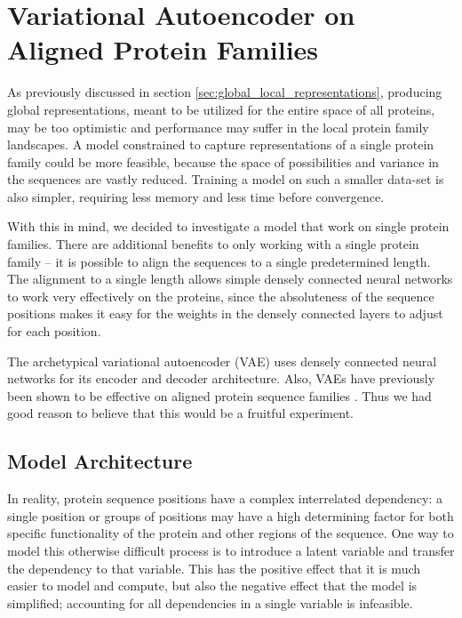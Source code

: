 \section{Variational Autoencoder on Aligned Protein Families}
\label{sec:variational_autoencoder_model}

As previously discussed in section \ref{sec:global_local_representations}, producing global representations, meant to be utilized for the entire space of all proteins, may be too optimistic and performance may suffer in the local protein family landscapes. A model constrained to capture representations of a single protein family could be more feasible, because the space of possibilities and variance in the sequences are vastly reduced. Training a model on such a smaller data-set is also simpler, requiring less memory and less time before convergence.

With this in mind, we decided to investigate a model that work on single protein families. There are additional benefits to only working with a single protein family -- it is possible to align the sequences to a single predetermined length. The alignment to a single length allows simple densely connected neural networks to work very effectively on the proteins, since the absoluteness of the sequence positions makes it easy for the weights in the densely connected layers to adjust for each position.

The archetypical variational autoencoder (VAE) uses densely connected neural networks for its encoder and decoder architecture. Also, VAEs have previously been shown to be effective on aligned protein sequence families \cite{riesselman2018deep}. Thus we had good reason to believe that this would be a fruitful experiment.

\subsection{Model Architecture}

In reality, protein sequence positions have a complex interrelated dependency: a single position or groups of positions may have a high determining factor for both specific functionality of the protein and other regions of the sequence. One way to model this otherwise difficult process is to introduce a latent variable and transfer the dependency to that variable. This has the positive effect that it is much easier to model and compute, but also the negative effect that the model is simplified; accounting for all dependencies in a single variable is infeasible.

